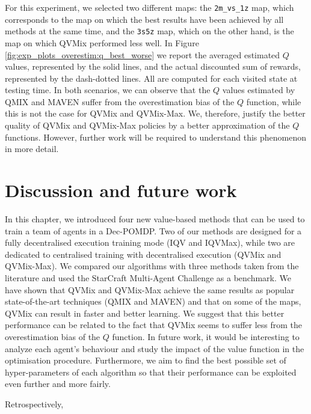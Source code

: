 For this experiment, we selected two different maps: the \texttt{2m\_vs\_1z} map, which corresponds to the map on which the best results have been achieved by all methods at the same time, and the \texttt{3s5z} map, which on the other hand, is the map on which QVMix performed less well.
In Figure \ref{fig:exp_plots_overestim:q_best_worse} we report the averaged estimated $Q$ values, represented by the solid lines, and the actual discounted sum of rewards, represented by the dash-dotted lines.
All are computed for each visited state at testing time.
In both scenarios, we can observe that the $Q$ values estimated by QMIX and MAVEN suffer from the overestimation bias of the $Q$ function, while this is not the case for QVMix and QVMix-Max.
We, therefore, justify the better quality of QVMix and QVMix-Max policies by a better approximation of the $Q$ functions.
However, further work will be required to understand this phenomenon in more detail.


\section{Discussion and future work} \label{sec:ch4_conclusion}

In this chapter, we introduced four new value-based methods that can be used to train a team of agents in a Dec-POMDP.
Two of our methods are designed for a fully decentralised execution training mode (IQV and IQVMax), while two are dedicated to centralised training with decentralised execution (QVMix and QVMix-Max).
We compared our algorithms with three methods taken from the literature and used the StarCraft Multi-Agent Challenge as a benchmark. 
We have shown that QVMix and QVMix-Max achieve the same results as popular state-of-the-art techniques (QMIX and MAVEN) and that on some of the maps, QVMix can result in faster and better learning.
We suggest that this better performance can be related to the fact that QVMix seems to suffer less from the overestimation bias of the $Q$ function.
In future work, it would be interesting to analyze each agent's behaviour and study the impact of the value function in the optimisation procedure.
Furthermore, we aim to find the best possible set of hyper-parameters of each algorithm so that their performance can be exploited even further and more fairly.

Retrospectively, 
